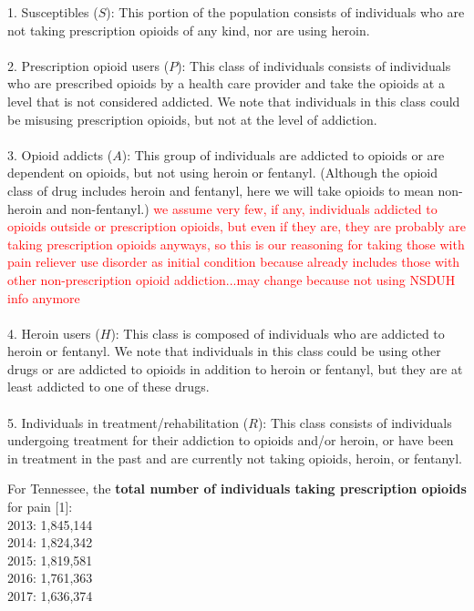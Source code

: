 \documentclass[12pt]{article}
\begin{document}
1. Susceptibles ($S$): This portion of the population consists of individuals who are not taking prescription opioids of any kind, nor are using heroin. \\ \\
2. Prescription opioid users ($P$): This class of individuals consists of individuals who are prescribed opioids by a health care provider and take the opioids at a level that is not considered addicted. We note that individuals in this class could be misusing prescription opioids, but not at the level of addiction.  \\ \\
3. Opioid addicts ($A$): This group of individuals are addicted to opioids or are dependent on opioids, but not using heroin or fentanyl. (Although the opioid class of drug includes heroin and fentanyl, here we will take opioids to mean non-heroin and non-fentanyl.) \textcolor{red}{we assume very few, if any, individuals addicted to opioids outside or prescription opioids, but even if they are, they are probably are taking prescription opioids anyways, so this is our reasoning for taking those with pain reliever use disorder as initial condition because already includes those with other non-prescription opioid addiction...may change because not using NSDUH info anymore} \\ \\
4. Heroin users ($H$): This class is composed of individuals who are addicted to heroin or fentanyl. We note that individuals in this class could be using other drugs or are addicted to opioids in addition to heroin or fentanyl, but they are at least addicted to one of these drugs. \\ \\
5. Individuals in treatment/rehabilitation ($R$): This class consists of individuals undergoing treatment for their addiction to opioids and/or heroin, or have been in treatment in the past and are currently not taking opioids, heroin, or fentanyl.


For Tennessee, the \textbf{total number of individuals taking prescription opioids} for pain [1]: \\
2013: 1,845,144 \\
2014: 1,824,342 \\
2015: 1,819,581 \\
2016: 1,761,363 \\
2017: 1,636,374 
\end{document}
